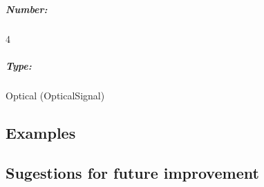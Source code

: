 \subparagraph*{Number:} 4

\subparagraph*{Type:} Optical (OpticalSignal)

\subsection*{Examples} 


\subsection*{Sugestions for future improvement}
